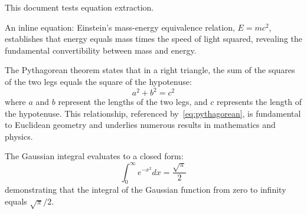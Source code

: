\documentclass{article}
\begin{document}
This document tests equation extraction.

An inline equation: Einstein's mass-energy equivalence relation, $E = mc^2$, establishes that energy equals mass times the speed of light squared, revealing the fundamental convertibility between mass and energy.

The Pythagorean theorem states that in a right triangle, the sum of the squares of the two legs equals the square of the hypotenuse:
\begin{equation}
\label{eq:pythagorean}
a^2 + b^2 = c^2
\end{equation}
where $a$ and $b$ represent the lengths of the two legs, and $c$ represents the length of the hypotenuse. This relationship, referenced by~\ref{eq:pythagorean}, is fundamental to Euclidean geometry and underlies numerous results in mathematics and physics.

The Gaussian integral evaluates to a closed form:
\begin{equation*}
\int_{0}^{\infty} e^{-x^2} dx = \frac{\sqrt{\pi}}{2}
\end{equation*}
demonstrating that the integral of the Gaussian function from zero to infinity equals $\sqrt{\pi}/2$.
\end{document}
